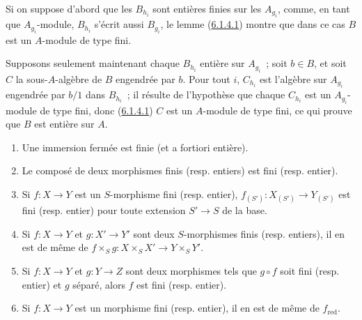 Si on suppose d'abord que les $B_{h_i}$ sont entières finies sur les
$A_{g_i}$, comme, en tant que $A_{g_i}$-module, $B_{h_i}$ s'écrit aussi
$B_{g_i}$, le lemme (\hyperref[II.6.1.4.1-fr]{6.1.4.1}) montre que dans ce cas
$B$ est un $A$-module de type fini.

Supposons seulement maintenant chaque $B_{h_i}$ entière sur $A_{g_i}$~; soit
$b\in B$, et soit $C$ la sous-$A$-algèbre de $B$ engendrée par $b$. Pour tout
$i$, $C_{h_i}$ est l'algèbre sur $A_{g_i}$ engendrée par $b/1$ dans
$B_{h_i}$~; il résulte de l'hypothèse que chaque $C_{h_i}$ est un
$A_{g_i}$-module de type fini, donc
(\hyperref[II.6.1.4.1-fr]{6.1.4.1}) $C$ est un $A$-module de type fini, ce qui
prouve que $B$ est entière sur $A$.

\begin{proposition}[6.1.5]
\label{II.6.1.5-fr}
\begin{enumerate}
\item[(i)] Une immersion fermée est finie (et a fortiori entière).
\item[(ii)] Le composé de deux morphismes finis (resp. entiers) est fini
(resp. entier).
\item[(iii)] Si $f:X\to Y$ est un $S$-morphisme fini (resp. entier),
$f_{(S')}:X_{(S')}\to Y_{(S')}$ est fini (resp. entier) pour toute extension
$S'\to S$ de la base.
\item[(iv)] Si $f:X\to Y$ et $g:X'\to Y'$ sont deux $S$-morphismes finis
(resp. entiers), il en est de même de
$f\times_S g:X\times_S X'\to Y\times_S Y'$.
\item[(v)] Si $f:X\to Y$ et $g:Y\to Z$ sont deux morphismes tels que $g\circ
f$ soit fini (resp. entier) et $g$ séparé, alors $f$ est fini (resp. entier).
\item[(vi)] Si $f:X\to Y$ est un morphisme fini (resp. entier), il en est de
même de $f_{\mathrm{red}}$.
\end{enumerate}
\end{proposition}

